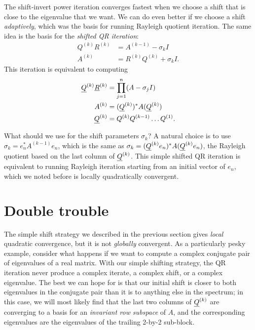 \documentclass[12pt, leqno]{article} %
\begin{document}
The shift-invert power iteration converges fastest when we choose a
shift that is close to the eigenvalue that we want.  We can do even
better if we choose a shift {\em adaptively}, which was the basis for
running Rayleigh quotient iteration.  The same idea is the basis
for the {\em shifted QR iteration}:
\begin{align}
  Q^{(k)} R^{(k)} &= A^{(k-1)} - \sigma_k I \label{sqr-1} \\
  A^{(k)} &= R^{(k)} Q^{(k)} + \sigma_k I. \label{sqr-2}
\end{align}
This iteration is equivalent to computing
\begin{align*}
  \underline{Q}^{(k)} \underline{R}^{(k)} &= \prod_{j=1}^n (A-\sigma_j I) \\
  A^{(k)} &= (\underline{Q}^{(k)})^* A (\underline{Q}^{(k)}) \\
  \underline{Q}^{(k)} &= Q^{(k)} Q^{(k-1)} \ldots Q^{(1)}.
\end{align*}

What should we use for the shift parameters $\sigma_k$?  A natural
choice is to use $\sigma_k = e_n^* A^{(k-1)} e_n$, which is the same
as $\sigma_k = (\underline{Q}^{(k)} e_n)^* A (\underline{Q}^{(k)} e_n)$, the Rayleigh quotient
based on the last column of $\underline{Q}^{(k)}$.  This simple shifted QR iteration
is equivalent to running Rayleigh iteration starting from an initial vector
of $e_n$, which we noted before is locally quadratically convergent.

\section{Double trouble}

The simple shift strategy we described in the previous section gives
{\em local} quadratic convergence, but it is not {\em globally} convergent.
%
As a particularly pesky example, consider what happens if we
want to compute a complex conjugate pair of eigenvalues of a real
matrix.  With our simple shifting strategy, 
the QR iteration
never produce a complex iterate, a
complex shift, or a complex eigenvalue.  The best we can hope for is
that our initial shift is closer to both eigenvalues in the conjugate
pair than it is to anything else in the spectrum; in this case, we
will most likely find that the last two columns of $\underline{Q}^{(k)}$ are
converging to a basis for an {\em invariant row subspace} of $A$,
and the corresponding eigenvalues are the eigenvalues of the trailing
2-by-2 sub-block.
\end{document}
